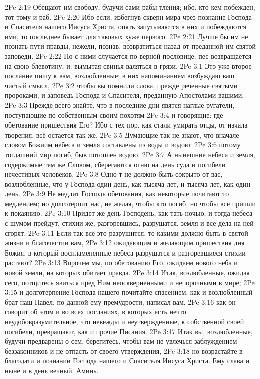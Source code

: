 \vs 2Pe 2:19 Обещают им свободу, будучи сами рабы тления; ибо, кто кем побежден, тот тому и раб.
\vs 2Pe 2:20 Ибо если, избегнув скверн мира чрез познание Господа и Спасителя нашего Иисуса Христа, опять запутываются в них и побеждаются ими, то последнее бывает для таковых хуже первого.
\vs 2Pe 2:21 Лучше бы им не познать пути правды, нежели, познав, возвратиться назад от преданной им святой заповеди.
\vs 2Pe 2:22 Но с ними случается по верной пословице: пес возвращается на свою блевотину, и: вымытая свинья  валяться в грязи.
\vs 2Pe 3:1 Это уже второе послание пишу к вам, возлюбленные; в них напоминанием возбуждаю ваш чистый смысл,
\vs 2Pe 3:2 чтобы вы помнили слова, прежде реченные святыми пророками, и заповедь Господа и Спасителя, преданную Апостолами вашими.
\vs 2Pe 3:3 Прежде всего знайте, что в последние дни явятся наглые ругатели, поступающие по собственным своим похотям
\vs 2Pe 3:4 и говорящие: где обетование пришествия Его? Ибо с тех пор, как стали умирать отцы, от начала творения, всё остается так же.
\vs 2Pe 3:5 Думающие так не знают, что вначале словом Божиим небеса и земля составлены из воды и водою:
\vs 2Pe 3:6 потому тогдашний мир погиб, быв потоплен водою.
\vs 2Pe 3:7 А нынешние небеса и земля, содержимые тем же Словом, сберегаются огню на день суда и погибели нечестивых человеков.
\rsbpar\vs 2Pe 3:8 Одно т не должно быть сокрыто от вас, возлюбленные, что у Господа один день, как тысяча лет, и тысяча лет, как один день.
\vs 2Pe 3:9 Не медлит Господь  обетования, как некоторые почитают то медлением; но долготерпит нас, не желая, чтобы кто погиб, но чтобы все пришли к покаянию.
\vs 2Pe 3:10 Придет же день Господень, как тать ночью, и тогда небеса с шумом прейдут, стихии же, разгоревшись, разрушатся, земля и все дела на ней сгорят.
\vs 2Pe 3:11 Если так всё это разрушится, то какими должно быть в святой жизни и благочестии вам,
\vs 2Pe 3:12 ожидающим и желающим пришествия дня Божия, в который воспламененные небеса разрушатся и разгоревшиеся стихии растают?
\vs 2Pe 3:13 Впрочем мы, по обетованию Его, ожидаем нового неба и новой земли, на которых обитает правда.
\rsbpar\vs 2Pe 3:14 Итак, возлюбленные, ожидая сего, потщитесь явиться пред Ним неоскверненными и непорочными в мире;
\vs 2Pe 3:15 и долготерпение Господа нашего почитайте спасением, как и возлюбленный брат наш Павел, по данной ему премудрости, написал вам,
\vs 2Pe 3:16 как он говорит об этом и во всех посланиях, в которых есть нечто неудобовразумительное, что невежды и неутвержденные, к собственной своей погибели, превращают, как и прочие Писания.
\vs 2Pe 3:17 Итак вы, возлюбленные, будучи предварены о сем, берегитесь, чтобы вам не увлечься заблуждением беззаконников и не отпасть от своего утверждения,
\vs 2Pe 3:18 но возрастайте в благодати и познании Господа нашего и Спасителя Иисуса Христа. Ему слава и ныне и в день вечный. Аминь.
